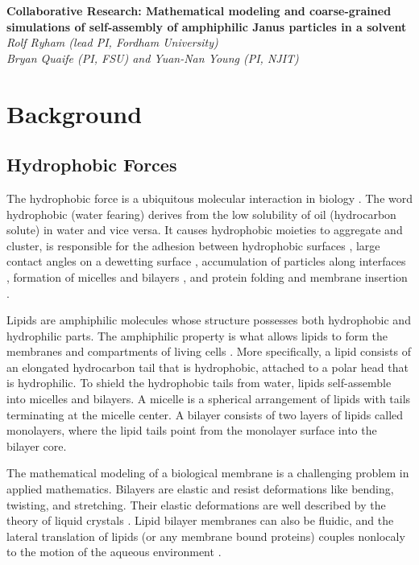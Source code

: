 
\noindent
{\bf {Collaborative Research: Mathematical modeling and coarse-grained simulations of self-assembly of amphiphilic Janus particles in a solvent}}\\
{\it Rolf Ryham (lead PI, Fordham University)}\\
{\it Bryan Quaife (PI, FSU) and Yuan-Nan Young (PI, NJIT)}
\section{Background}
\label{sec:background}
\subsection{Hydrophobic Forces}
\label{sec:hydrophobicforce}

The hydrophobic force is a ubiquitous molecular interaction in biology \cite{Israelachvili1954}.
The word hydrophobic (water fearing) derives from the low solubility of oil (hydrocarbon solute) in water and vice versa. 
It causes hydrophobic moieties to aggregate and cluster,
is responsible for the adhesion between hydrophobic surfaces \cite{Ducker2016}, large contact angles on a 
dewetting surface \cite{Arenas2019,Sandre1999}, accumulation of particles along interfaces \cite{Lee2013,Lee2014}, 
formation of micelles and bilayers \cite{Israelachvili80}, and protein folding and membrane insertion \cite{Kabelka2018}.

Lipids are amphiphilic molecules whose  structure possesses
both hydrophobic and hydrophilic parts. 
The amphiphilic property is what allows lipids to form the membranes and 
compartments of living cells \cite{Israelachvili80}. 
More specifically, a lipid consists of 
an elongated hydrocarbon tail that is hydrophobic, attached to a polar head that is hydrophilic.
To shield the hydrophobic tails from water, lipids self-assemble into micelles and bilayers. 
A micelle is a spherical arrangement of lipids with tails terminating at the micelle center. 
A bilayer consists of two layers of lipids called monolayers, where the lipid tails point 
from the monolayer surface into the bilayer core. 

The mathematical modeling of a biological membrane is a challenging problem in applied mathematics. 
Bilayers are elastic and resist deformations like bending, twisting, and stretching.
Their elastic deformations are well described by the theory of liquid crystals \cite{ANDRIENKO2018520}.
Lipid bilayer membranes can also be fluidic, and the lateral translation of lipids (or any membrane bound
proteins) couples nonlocaly to the motion of the aqueous environment \cite{MerkelSackmannEvans1989,StoneAjdari1998_JFM,OppenheimerDiamant2009_BJ,OppenheimerDiamant2011_PRL}. 

